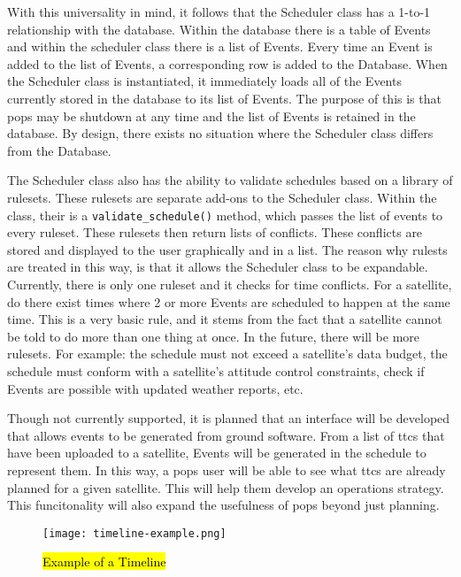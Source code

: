 With this universality in mind, it follows that the Scheduler class has a
1-to-1 relationship with the database. Within the database there is a table of
Events and within the scheduler class there is a list of Events. Every time an
Event is added to the list of Events, a corresponding row is added to the
Database. When the Scheduler class is instantiated, it immediately loads all of
the Events currently stored in the database to its list of Events. The purpose
of this is that \gls{pops} may be shutdown at any time and the list of Events
is retained in the database. By design, there exists no situation where the
Scheduler class differs from the Database.

The Scheduler class also has the ability to validate schedules based on a
library of rulesets. These rulesets are separate add-ons to the Scheduler
class. Within the class, their is a \texttt{validate\_schedule()} method, which
passes the list of events to every ruleset. These rulesets then return lists of
conflicts. These conflicts are stored and displayed to the user graphically and
in a list. The reason why rulests are treated in this way, is that it allows
the Scheduler class to be expandable. Currently, there is only one ruleset and
it checks for time conflicts. For a satellite, do there exist times where 2 or
more Events are scheduled to happen at the same time.  This is a very basic
rule, and it stems from the fact that a satellite cannot be told to do more
than one thing at once. In the future, there will be more rulesets. For
example: the schedule must not exceed a satellite's data budget, the schedule
must conform with a satellite's attitude control constraints, check if Events
are possible with updated weather reports, etc.

Though not currently supported, it is planned that an interface will be
developed that allows events to be generated from ground software. From a list
of \glspl{ttc} that have been uploaded to a satellite, Events will be generated
in the schedule to represent them. In this way, a \gls{pops} user will be able
to see what \glspl{ttc} are already planned for a given satellite. This will
help them develop an operations strategy. This funcitonality will also expand
the usefulness of \gls{pops} beyond just planning.

\begin{figure}
    \centering
    \texttt{[image: timeline-example.png]} 
    \caption{\hl{Example of a Timeline}}
    \label{fig:scheduler-timeline}
\end{figure}

